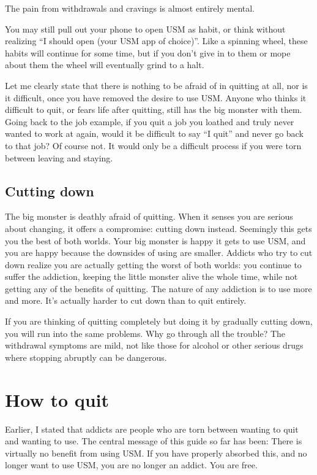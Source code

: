 \documentclass[
  openany]{book}
\begin{document}
The pain from withdrawals and cravings is almost entirely mental.

You may still pull out your phone to open USM as habit, or think without realizing ``I should open (your USM app of choice)''. Like a spinning wheel, these habits will continue for some time, but if you don't give in to them or mope about them the wheel will eventually grind to a halt.

Let me clearly state that there is nothing to be afraid of in quitting at all, nor is it difficult, once you have removed the desire to use USM. Anyone who thinks it difficult to quit, or fears life after quitting, still has the big monster with them. Going back to the job example, if you quit a job you loathed and truly never wanted to work at again, would it be difficult to say ``I quit'' and never go back to that job? Of course not. It would only be a difficult process if you were torn between leaving and staying.

\section{Cutting down}\label{cutting-down}

The big monster is deathly afraid of quitting. When it senses you are serious about changing, it offers a compromise: cutting down instead. Seemingly this gets you the best of both worlds. Your big monster is happy it gets to use USM, and you are happy because the downsides of using are smaller. Addicts who try to cut down realize you are actually getting the worst of both worlds: you continue to suffer the addiction, keeping the little monster alive the whole time, while not getting any of the benefits of quitting. The nature of any addiction is to use more and more. It's actually harder to cut down than to quit entirely.

If you are thinking of quitting completely but doing it by gradually cutting down, you will run into the same problems. Why go through all the trouble? The withdrawal symptoms are mild, not like those for alcohol or other serious drugs where stopping abruptly can be dangerous.

\chapter{How to quit}\label{how-to-quit}

Earlier, I stated that addicts are people who are torn between wanting to quit and wanting to use. The central message of this guide so far has been: There is virtually no benefit from using USM. If you have properly absorbed this, and no longer want to use USM, you are no longer an addict. You are free.
\end{document}
